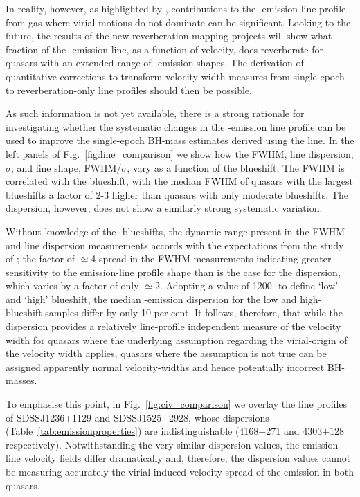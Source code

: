 In reality, however, as highlighted by \citet{denney12}, contributions to the -emission line profile from gas where virial motions do not dominate can be significant. 
Looking to the future, the results of the new reverberation-mapping projects \citep{shen15, kingoz15} will show what fraction of the -emission line, as a function of velocity, does reverberate for quasars with an extended range of -emission shapes. 
The derivation of quantitative corrections to transform velocity-width measures from single-epoch to reverberation-only line profiles should then be possible. 

As such information is not yet available, there is a strong rationale for investigating whether the systematic changes in the -emission line profile can be used to improve the single-epoch BH-mass estimates derived using the  line. 
In the left panels of Fig.~\ref{fig:line_comparison} we show how the  FWHM, line dispersion, $\sigma$, and line shape, FWHM/$\sigma$, vary as a function of the blueshift. 
The  FWHM is correlated with the blueshift, with the median FWHM of quasars with the largest blueshifts a factor of 2-3 higher than quasars with only moderate blueshifts.
The dispersion, however, does not show a similarly strong systematic variation. 

Without knowledge of the -blueshifts, the dynamic range present in the FWHM and line dispersion measurements accords with the expectations from the study of \citet{denney13}; the factor of $\simeq$4 spread in the FWHM measurements indicating greater sensitivity to the emission-line profile shape than is the case for the dispersion, which varies by a factor of only $\simeq$2. 
Adopting a value of 1200\,\kms\, to define `low' and `high' blueshift, the median -emission dispersion for the low and high-blueshift samples differ by only 10 per cent. 
It follows, therefore, that while the dispersion provides a relatively line-profile independent measure of the velocity width for quasars where the underlying assumption regarding the virial-origin of the velocity width applies, quasars where the assumption is not true can be assigned apparently normal velocity-widths and hence potentially incorrect BH-masses. 

To emphasise this point, in Fig.~\ref{fig:civ_comparison} we overlay the  line profiles of SDSSJ1236+1129 and SDSSJ1525+2928, whose dispersions (Table~\ref{tab:emissionproperties}) are indistinguishable (4168$\pm$271 and 4303$\pm128$\,\kms respectively). 
Notwithstanding the very similar dispersion values, the emission-line velocity fields differ dramatically and, therefore, the dispersion values cannot be measuring accurately the virial-induced velocity spread of the  emission in both quasars.

